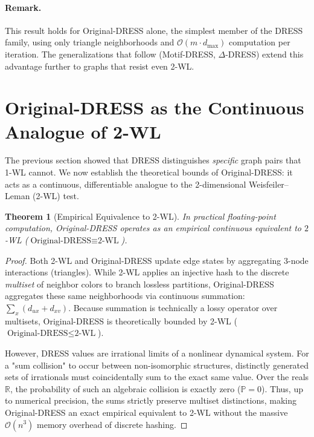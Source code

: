 \documentclass[11pt,a4paper]{article}
\newtheorem{theorem}{Theorem}
\begin{document}
\paragraph{Remark.} This result holds for Original-DRESS alone, the simplest member of the DRESS family, using only triangle neighborhoods and $\mathcal{O}(m \cdot d_{\max})$ computation per iteration. The generalizations that follow (Motif-DRESS, $\Delta$-DRESS) extend this advantage further to graphs that resist even 2-WL.

\section{Original-DRESS as the Continuous Analogue of 2-WL}

The previous section showed that DRESS distinguishes \emph{specific} graph pairs that 1-WL cannot. We now establish the theoretical bounds of Original-DRESS: it acts as a continuous, differentiable analogue to the 2-dimensional Weisfeiler--Leman (2-WL) test.

\begin{theorem}[Empirical Equivalence to 2-WL]
\label{thm:dress-2wl-bound}
In practical floating-point computation, Original-DRESS operates as an empirical continuous equivalent to $2$-WL ($\text{Original-DRESS} \equiv \text{2-WL}$).
\end{theorem}

\begin{proof}
Both 2-WL and Original-DRESS update edge states by aggregating 3-node interactions (triangles). While 2-WL applies an injective hash to the discrete \emph{multiset} of neighbor colors to branch lossless partitions, Original-DRESS aggregates these same neighborhoods via continuous summation: $\sum_{x} (d_{ux} + d_{xv})$. Because summation is technically a lossy operator over multisets, Original-DRESS is theoretically bounded by 2-WL ($\text{Original-DRESS} \le \text{2-WL}$).

However, DRESS values are irrational limits of a nonlinear dynamical system. For a "sum collision" to occur between non-isomorphic structures, distinctly generated sets of irrationals must coincidentally sum to the exact same value. Over the reals $\mathbb{R}$, the probability of such an algebraic collision is exactly zero ($\mathbb{P} = 0$). Thus, up to numerical precision, the sums strictly preserve multiset distinctions, making Original-DRESS an exact empirical equivalent to 2-WL without the massive $\mathcal{O}(n^3)$ memory overhead of discrete hashing.
\end{proof}
\end{document}
